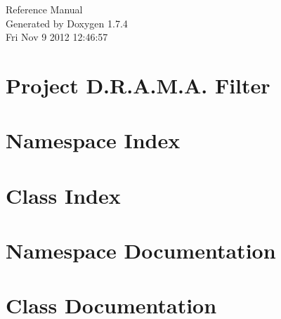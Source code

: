\documentclass[a4paper]{book}
\begin{document}
\hypersetup{pageanchor=false}
\begin{titlepage}
\vspace*{7cm}
\begin{center}
{\Large Reference Manual}\\
\vspace*{1cm}
{\large Generated by Doxygen 1.7.4}\\
\vspace*{0.5cm}
{\small Fri Nov 9 2012 12:46:57}\\
\end{center}
\end{titlepage}
\clearemptydoublepage
{}
\tableofcontents
\clearemptydoublepage
{}
\hypersetup{pageanchor=true}
\chapter{Project D.R.A.M.A. Filter}
\label{index}\hypertarget{index}{}
\chapter{Namespace Index}

\chapter{Class Index}

\chapter{Namespace Documentation}

\chapter{Class Documentation}




















\printindex
\end{document}
